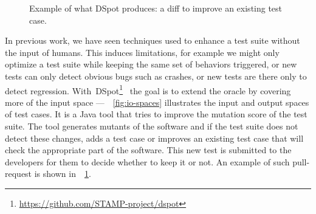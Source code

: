 \documentclass[11pt]{sdm}
\newcommand{\addref}[1]{\colorbox{TealBlue!100}{\textcolor{white}{\textbf{$[$\ifx&#1&\ \else#1\fi$]$}}}}
\newcommand{\dspot}{DSpot\xspace}
\begin{document}
\begin{figure}
  \centering
  \caption{Example of what \dspot{} produces: a diff to improve an existing test case.}
\label{fig:diff-protostuff}
\end{figure}

In previous work, we have seen techniques used to enhance a test suite without the input of humans.
This induces limitations, for example we might only optimize a test suite while keeping the same set of behaviors triggered, or new tests can only detect obvious bugs such as crashes, or new tests are there only to detect regression.
With~\dspot{}\footnote{\url{https://github.com/STAMP-project/dspot}}~\cite{baudry2015dspot} the goal is to extend the oracle by covering more of the input space ---~\figurename~\ref{fig:io-spaces} illustrates the input and output spaces of test cases.
It is a Java tool that tries to improve the mutation score of the test suite.
The tool generates mutants of the software and if the test suite does not detect these changes, adds a test case or improves an existing test case that will check the appropriate part of the software.
This new test is submitted to the developers for them to decide whether to keep it or not.
An example of such pull-request is shown in~\figurename~\ref{fig:diff-protostuff}.
\end{document}
